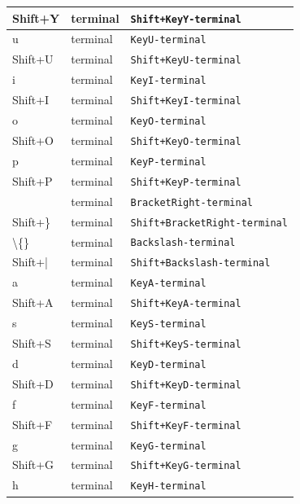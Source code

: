 \documentclass[11pt, a4paper]{article}
\begin{document}
\begin{appendices}
\begin{longtable}{|p{}|p{}|p{}|}
    Shift+Y & terminal & \texttt{Shift+KeyY-terminal} \\ \hline
    u & terminal & \texttt{KeyU-terminal} \\ \hline
    Shift+U & terminal & \texttt{Shift+KeyU-terminal} \\ \hline
    i & terminal & \texttt{KeyI-terminal} \\ \hline
    Shift+I & terminal & \texttt{Shift+KeyI-terminal} \\ \hline
    o & terminal & \texttt{KeyO-terminal} \\ \hline
    Shift+O & terminal & \texttt{Shift+KeyO-terminal} \\ \hline
    p & terminal & \texttt{KeyP-terminal} \\ \hline
    Shift+P & terminal & \texttt{Shift+KeyP-terminal} \\ \hline
    [ & terminal & \texttt{BracketLeft-terminal} \\ \hline
    Shift+\{ & terminal & \texttt{Shift+BracketLeft-terminal} \\ \hline
    ] & terminal & \texttt{BracketRight-terminal} \\ \hline
    Shift+\} & terminal & \texttt{Shift+BracketRight-terminal} \\ \hline
    \textbackslash\{\} & terminal & \texttt{Backslash-terminal} \\ \hline
    Shift+| & terminal & \texttt{Shift+Backslash-terminal} \\ \hline
    a & terminal & \texttt{KeyA-terminal} \\ \hline
    Shift+A & terminal & \texttt{Shift+KeyA-terminal} \\ \hline
    s & terminal & \texttt{KeyS-terminal} \\ \hline
    Shift+S & terminal & \texttt{Shift+KeyS-terminal} \\ \hline
    d & terminal & \texttt{KeyD-terminal} \\ \hline
    Shift+D & terminal & \texttt{Shift+KeyD-terminal} \\ \hline
    f & terminal & \texttt{KeyF-terminal} \\ \hline
    Shift+F & terminal & \texttt{Shift+KeyF-terminal} \\ \hline
    g & terminal & \texttt{KeyG-terminal} \\ \hline
    Shift+G & terminal & \texttt{Shift+KeyG-terminal} \\ \hline
    h & terminal & \texttt{KeyH-terminal} \\ \hline

\end{longtable}
\end{appendices}
\end{document}
